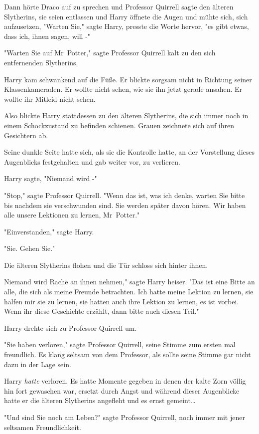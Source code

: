 {Dann hörte Draco auf zu sprechen und Professor Quirrell sagte den älteren Slytherins, sie seien entlassen und Harry öffnete die Augen und mühte sich, sich aufzusetzen, "Warten Sie," sagte Harry, presste die Worte hervor, "es gibt etwas, dass ich, ihnen sagen, will -"

"Warten Sie auf Mr~Potter," sagte Professor Quirrell kalt zu den sich entfernenden Slytherins.

Harry kam schwankend auf die Füße. Er blickte sorgsam nicht in Richtung seiner Klassenkameraden. Er wollte nicht sehen, wie sie ihn jetzt gerade ansahen. Er wollte ihr Mitleid nicht sehen.

Also blickte Harry stattdessen zu den älteren Slytherins, die sich immer noch in einem Schockzustand zu befinden schienen. Grauen zeichnete sich auf ihren Gesichtern ab.

Seine dunkle Seite hatte sich, als sie die Kontrolle hatte, an der Vorstellung dieses Augenblicks festgehalten und gab weiter vor, zu verlieren.

Harry sagte, "Niemand wird -"

"Stop," sagte Professor Quirrell. "Wenn das ist, was ich denke, warten Sie bitte bis nachdem sie verschwunden sind. Sie werden später davon hören. Wir haben alle unsere Lektionen zu lernen, Mr~Potter."

"Einverstanden," sagte Harry.

"Sie. Gehen Sie."

Die älteren Slytherins flohen und die Tür schloss sich hinter ihnen.

Niemand wird Rache an ihnen nehmen," sagte Harry heiser. "Das ist eine Bitte an alle, die sich als meine Freunde betrachten. Ich hatte meine Lektion zu lernen, sie halfen mir sie zu lernen, sie hatten auch ihre Lektion zu lernen, es ist vorbei. Wenn ihr diese Geschichte erzählt, dann bitte auch diesen Teil."

Harry drehte sich zu Professor Quirrell um.

"Sie haben verloren," sagte Professor Quirrell, seine Stimme zum ersten mal freundlich. Es klang seltsam von dem Professor, als sollte seine Stimme gar nicht dazu in der Lage sein.

Harry \emph{hatte} verloren. Es hatte Momente gegeben in denen der kalte Zorn völlig hin fort gewaschen war, ersetzt durch Angst und während dieser Augenblicke hatte er die älteren Slytherins angefleht und es ernst gemeint…

"Und sind Sie noch am Leben?" sagte Professor Quirrell, noch immer mit jener seltsamen Freundlichkeit.

}
